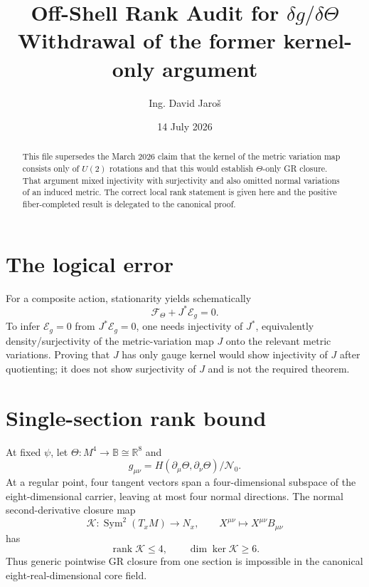 \documentclass[11pt,a4paper]{article}
\title{Off-Shell Rank Audit for $\delta g/\delta\Theta$\\
\large Withdrawal of the former kernel-only argument}
\author{Ing. David Jaroš}
\date{14 July 2026}
\begin{document}
\maketitle

\begin{abstract}
This file supersedes the March 2026 claim that the kernel of the metric
variation map consists only of $U(2)$ rotations and that this would establish
$\Theta$-only GR closure.  That argument mixed injectivity with surjectivity and
also omitted normal variations of an induced metric.  The correct local rank
statement is given here and the positive fiber-completed result is delegated to
the canonical proof.
\end{abstract}

\section{The logical error}

For a composite action, stationarity yields schematically
\begin{equation}
 \mathscr F_\Theta+J^*\mathscr E_g=0.
\end{equation}
To infer $\mathscr E_g=0$ from $J^*\mathscr E_g=0$, one needs injectivity of
$J^*$, equivalently density/surjectivity of the metric-variation map $J$ onto
the relevant metric variations.  Proving that $J$ has only gauge kernel would
show injectivity of $J$ after quotienting; it does not show surjectivity of $J$
and is not the required theorem.

\section{Single-section rank bound}

At fixed $\psi$, let $\Theta:M^4\to\mathbb B\cong\mathbb R^8$ and
\begin{equation}
 g_{\mu\nu}=H(\partial_\mu\Theta,\partial_\nu\Theta)/\mathcal N_0.
\end{equation}
At a regular point, four tangent vectors span a four-dimensional subspace of
the eight-dimensional carrier, leaving at most four normal directions.  The
normal second-derivative closure map
\begin{equation}
 \mathcal K:\operatorname{Sym}^2(T_xM)\to N_x,
 \qquad X^{\mu\nu}\mapsto X^{\mu\nu}B_{\mu\nu}
\end{equation}
has
\begin{equation}
 \operatorname{rank}\mathcal K\le4,
 \qquad \dim\ker\mathcal K\ge6.
\end{equation}
Thus generic pointwise GR closure from one section is impossible in the
canonical eight-real-dimensional core field.
\end{document}
